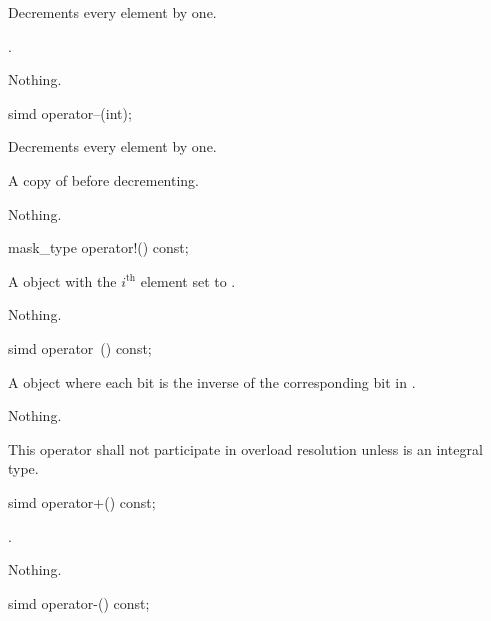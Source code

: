 \begin{itemdescr}
  \pnum\effects
  Decrements every element by one.

  \pnum\returns
  .

  \pnum\throws Nothing.

\end{itemdescr}

\begin{itemdecl}
simd operator--(int);
\end{itemdecl}

\begin{itemdescr}
  \pnum\effects
  Decrements every element by one.

  \pnum\returns
  A copy of  before decrementing.

  \pnum\throws Nothing.
\end{itemdescr}

\begin{itemdecl}
mask_type operator!() const;
\end{itemdecl}

\begin{itemdescr}
  \pnum\returns
  A  object with the $i^\text{th}$ element set to  \foralli.

  \pnum\throws Nothing.

\end{itemdescr}

\begin{itemdecl}
simd operator~() const;
\end{itemdecl}

\begin{itemdescr}
  \pnum\returns
  A  object where each bit is the inverse of the corresponding bit in .

  \pnum\throws Nothing.

  \pnum\remarks
  This operator shall not participate in overload resolution unless  is an integral type.
\end{itemdescr}

\begin{itemdecl}
simd operator+() const;
\end{itemdecl}

\begin{itemdescr}
  \pnum\returns
  .

  \pnum\throws Nothing.
\end{itemdescr}

\begin{itemdecl}
simd operator-() const;
\end{itemdecl}

